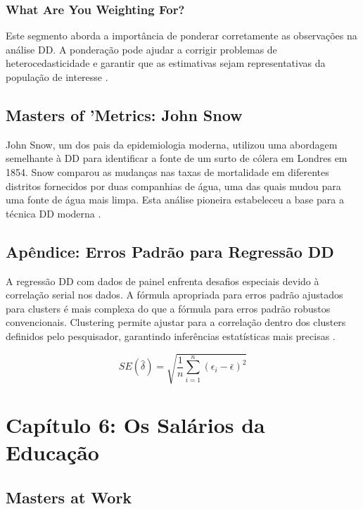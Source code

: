 \documentclass[a4paper,12pt]{article}[abntex2]
\begin{document}
\subsubsection*{What Are You Weighting For?}

Este segmento aborda a importância de ponderar corretamente as observações na análise DD. A ponderação pode ajudar a corrigir problemas de heterocedasticidade e garantir que as estimativas sejam representativas da população de interesse .

\subsection*{Masters of 'Metrics: John Snow}

John Snow, um dos pais da epidemiologia moderna, utilizou uma abordagem semelhante à DD para identificar a fonte de um surto de cólera em Londres em 1854. Snow comparou as mudanças nas taxas de mortalidade em diferentes distritos fornecidos por duas companhias de água, uma das quais mudou para uma fonte de água mais limpa. Esta análise pioneira estabeleceu a base para a técnica DD moderna  .

\subsection*{Apêndice: Erros Padrão para Regressão DD}

A regressão DD com dados de painel enfrenta desafios especiais devido à correlação serial nos dados. A fórmula apropriada para erros padrão ajustados para clusters é mais complexa do que a fórmula para erros padrão robustos convencionais. Clustering permite ajustar para a correlação dentro dos clusters definidos pelo pesquisador, garantindo inferências estatísticas mais precisas  .

\begin{equation}
    SE(\hat{\delta}) = \sqrt{\frac{1}{n} \sum_{i=1}^n (\epsilon_i - \bar{\epsilon})^2}
\end{equation}

\newpage
\section{Capítulo 6: Os Salários da Educação}

\subsection*{Masters at Work}
\end{document}
